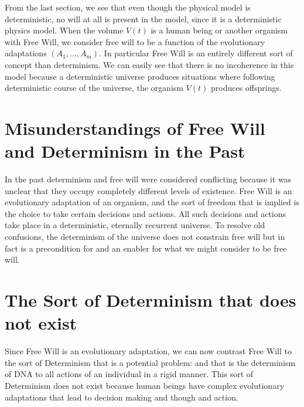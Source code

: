 \documentclass{amsart}
\begin{document}
From the last section, we see that even though the physical model is deterministic, no will at all is present in the model, since it is a deterministic physics model.  When the volume $V(t)$ is a human being or another organism with Free Will, we consider free will to be a function of the evolutionary adaptations $(A_1, \dots, A_m)$.  In particular Free Will is an entirely different sort of concept than determinism.  We can easily see that there is no incoherence in this model because a deterministic universe produces situations where following deterministic course of the universe, the organism $V(t)$ produces offsprings.  

\section{Misunderstandings of Free Will and Determinism in the Past}

In the past determinism and free will were considered conflicting because it was unclear that they occupy completely different levels of existence.  Free Will is an evolutionary adaptation of an organism, and the sort of freedom that is implied is the choice to take certain decisions and actions.  All such decisions and actions take place in a deterministic, eternally recurrent universe.  To resolve old confusions, the determinism of the universe does not constrain free will but in fact is a precondition for and an enabler for what we might consider to be free will.

\section{The Sort of Determinism that does not exist}
Since Free Will is an evolutionary adaptation, we can now contrast Free Will to the sort of Determinism that is a potential problem: and that is the determinism of DNA to all actions of an individual in a rigid manner.  This sort of Determinism does not exist because human beings have complex evolutionary adaptations that lead to decision making and though and action.  
\end{document}
